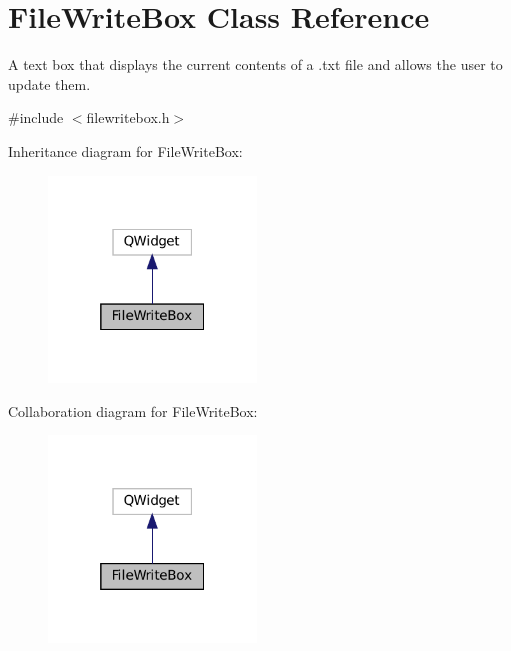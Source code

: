 \hypertarget{classFileWriteBox}{}\section{File\+Write\+Box Class Reference}
\label{classFileWriteBox}


A text box that displays the current contents of a .txt file and allows the user to update them.  




{\ttfamily \#include $<$filewritebox.\+h$>$}



Inheritance diagram for File\+Write\+Box\+:
\nopagebreak
\begin{figure}[H]
\begin{center}
\leavevmode
\includegraphics[width=157pt]{classFileWriteBox__inherit__graph}
\end{center}
\end{figure}


Collaboration diagram for File\+Write\+Box\+:
\nopagebreak
\begin{figure}[H]
\begin{center}
\leavevmode
\includegraphics[width=157pt]{classFileWriteBox__coll__graph}
\end{center}
\end{figure}

